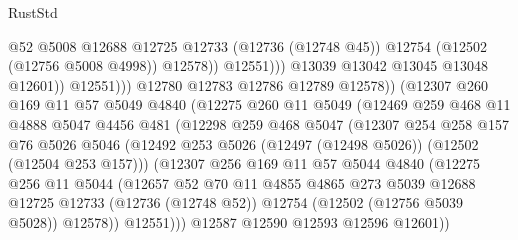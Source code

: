 \begin{lexlean}{RustStd}
\begin{coremodule}
                                    @52
                                    @5008
                                    @12688
                                    @12725
                                    @12733
                                    (@12736 (@12748 @45))
                                    @12754
                                    (@12502 (@12756 @5008 @4998))
                                    @12578))
                                @12551)))
                          @13039
                          @13042
                          @13045
                          @13048
                          @12601))
                      @12551)))
                @12780
                @12783
                @12786
                @12789
                @12578))
            (@12307
              @260
              @169
              @11
              @57
              @5049
              @4840
              (@12275
                @260
                @11
                @5049
                (@12469
                  @259
                  @468
                  @11
                  @4888
                  @5047
                  @4456
                  @481
                  (@12298
                    @259
                    @468
                    @5047
                    (@12307
                      @254
                      @258
                      @157
                      @76
                      @5026
                      @5046
                      (@12492 @253 @5026 (@12497 (@12498 @5026)) (@12502 (@12504 @253 @157)))
                      (@12307
                        @256
                        @169
                        @11
                        @57
                        @5044
                        @4840
                        (@12275
                          @256
                          @11
                          @5044
                          (@12657
                            @52
                            @70
                            @11
                            @4855
                            @4865
                            @273
                            @5039
                            @12688
                            @12725
                            @12733
                            (@12736 (@12748 @52))
                            @12754
                            (@12502 (@12756 @5039 @5028))
                            @12578))
                        @12551)))
                  @12587
                  @12590
                  @12593
                  @12596
                  @12601))

\end{coremodule}
\end{lexlean}

